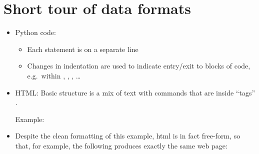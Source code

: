 \documentclass[letterpaper,10pt,english]{sphinxmanual}
\begin{document}
\section{Short tour of data formats}
\label{\detokenize{lecture_notes/lec13_files_web:short-tour-of-data-formats}}\begin{itemize}
\item {} 
Python code:
\begin{itemize}
\item {} 
Each statement is on a separate line

\item {} 
Changes in indentation are used to indicate entry/exit to blocks
of code, e.g. within , , , …

\end{itemize}

\item {} 
HTML: Basic structure is a mix of text with commands that are
inside “tags”  .

Example:

%
\begin{sphinxVerbatim}[commandchars=\\\{\}]
         
            
           
\end{sphinxVerbatim}

\item {} 
Despite the clean formatting of this example, html is in fact
free-form, so that, for example, the following produces exactly the
same web page:


\end{itemize}
\end{document}
